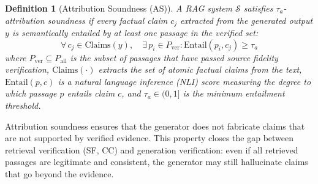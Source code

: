 \documentclass[journal,10pt]{IEEEtran}
\newtheorem{definition}{Definition}
\newcommand{\calS}{\mathcal{S}}
\begin{document}
\begin{definition}[Attribution Soundness (AS)]\label{def:as}
A RAG system $\calS$ satisfies $\tau_a$-attribution soundness if every factual claim $c_j$ extracted from the generated output $y$ is semantically entailed by at least one passage in the verified set:
\begin{equation}\label{eq:as}
\forall\, c_j \in \text{Claims}(y), \quad \exists\, p_i \in P_{\text{ver}} : \text{Entail}(p_i, c_j) \geq \tau_a
\end{equation}
where $P_{\text{ver}} \subseteq P_{\text{all}}$ is the subset of passages that have passed source fidelity verification, $\text{Claims}(\cdot)$ extracts the set of atomic factual claims from the text, $\text{Entail}(p, c)$ is a natural language inference (NLI) score measuring the degree to which passage $p$ entails claim $c$, and $\tau_a \in (0, 1]$ is the minimum entailment threshold.
\end{definition}

Attribution soundness ensures that the generator does not fabricate claims that are not supported by verified evidence. This property closes the gap between retrieval verification (SF, CC) and generation verification: even if all retrieved passages are legitimate and consistent, the generator may still hallucinate claims that go beyond the evidence.

\end{document}
